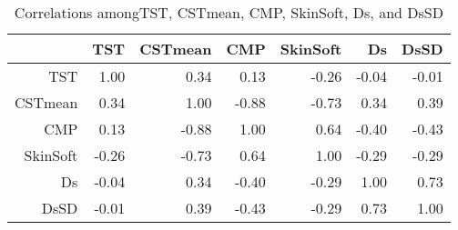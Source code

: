 \begin{table}[ht]
\centering
\caption{Correlations amongTST, CSTmean, CMP, SkinSoft, Ds, and DsSD}
\label{tab:collfibcor}
\begin{tabular}{|rrrrrrr|}
  \hline
 & TST & CSTmean & CMP & SkinSoft & Ds & DsSD \\ 
  \hline
TST & 1.00 & 0.34 & 0.13 & -0.26 & -0.04 & -0.01 \\ 
  CSTmean & 0.34 & 1.00 & -0.88 & -0.73 & 0.34 & 0.39 \\ 
  CMP & 0.13 & -0.88 & 1.00 & 0.64 & -0.40 & -0.43 \\ 
  SkinSoft & -0.26 & -0.73 & 0.64 & 1.00 & -0.29 & -0.29 \\ 
  Ds & -0.04 & 0.34 & -0.40 & -0.29 & 1.00 & 0.73 \\ 
  DsSD & -0.01 & 0.39 & -0.43 & -0.29 & 0.73 & 1.00 \\ 
   \hline
\end{tabular}
\end{table}

